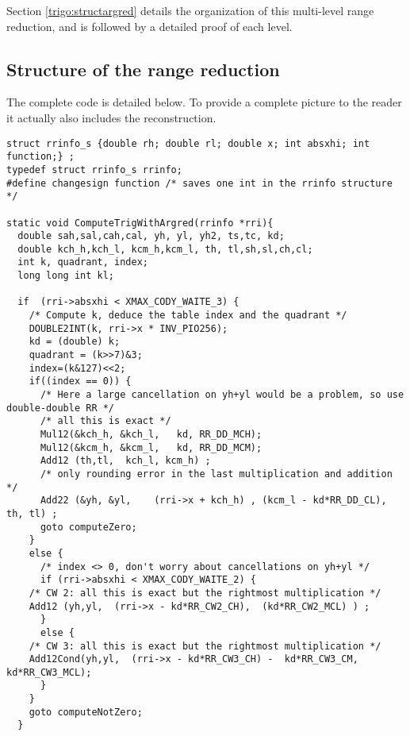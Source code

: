Section \ref{trigo:structargred} details the organization of this
multi-level range reduction, and is followed by a detailed proof of
each level.



\subsection{Structure of the range reduction
  \label{trigo:structargred}} The complete code is detailed below. To
provide a complete picture to the reader it actually also includes the
reconstruction.

\begin{lstlisting}[caption={Multilevel range reduction \label{lst:trig:argred}},firstnumber=1]
struct rrinfo_s {double rh; double rl; double x; int absxhi; int function;} ;
typedef struct rrinfo_s rrinfo;
#define changesign function /* saves one int in the rrinfo structure */

static void ComputeTrigWithArgred(rrinfo *rri){
  double sah,sal,cah,cal, yh, yl, yh2, ts,tc, kd;
  double kch_h,kch_l, kcm_h,kcm_l, th, tl,sh,sl,ch,cl;
  int k, quadrant, index;
  long long int kl;

  if  (rri->absxhi < XMAX_CODY_WAITE_3) {
    /* Compute k, deduce the table index and the quadrant */
    DOUBLE2INT(k, rri->x * INV_PIO256);
    kd = (double) k;
    quadrant = (k>>7)&3;
    index=(k&127)<<2;
    if((index == 0)) {
      /* Here a large cancellation on yh+yl would be a problem, so use double-double RR */
      /* all this is exact */
      Mul12(&kch_h, &kch_l,   kd, RR_DD_MCH);
      Mul12(&kcm_h, &kcm_l,   kd, RR_DD_MCM);
      Add12 (th,tl,  kch_l, kcm_h) ;
      /* only rounding error in the last multiplication and addition */
      Add22 (&yh, &yl,    (rri->x + kch_h) , (kcm_l - kd*RR_DD_CL),   th, tl) ;
      goto computeZero;
    }
    else {
      /* index <> 0, don't worry about cancellations on yh+yl */
      if (rri->absxhi < XMAX_CODY_WAITE_2) {
	/* CW 2: all this is exact but the rightmost multiplication */
	Add12 (yh,yl,  (rri->x - kd*RR_CW2_CH),  (kd*RR_CW2_MCL) ) ;
      }
      else {
	/* CW 3: all this is exact but the rightmost multiplication */
	Add12Cond(yh,yl,  (rri->x - kd*RR_CW3_CH) -  kd*RR_CW3_CM,   kd*RR_CW3_MCL);
      }
    }
    goto computeNotZero;
  }


\end{lstlisting}
